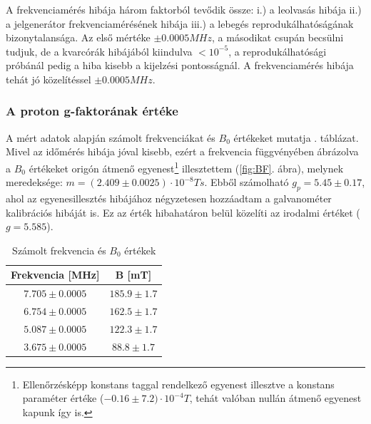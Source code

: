 \documentclass[a4paper,12pt]{article}
\begin{document}
A frekvenciamérés hibája három faktorból tevődik össze: i.) a leolvasás hibája ii.) a jelgenerátor frekvenciamérésének hibája iii.) a lebegés reprodukálhatóságának bizonytalansága. Az első mértéke $\pm0.0005MHz$, a másodikat csupán becsülni tudjuk, de a kvarcórák hibájából kiindulva $< 10^{-5}$, a reprodukálhatósági próbánál pedig a hiba kisebb a kijelzési pontosságnál. A frekvenciamérés hibája tehát jó közelítéssel $\pm0.0005MHz$.

\subsubsection{A proton g-faktorának értéke}

A mért adatok alapján számolt frekvenciákat és $B_0$ értékeket mutatja . táblázat. Mivel az időmérés hibája jóval kisebb, ezért a frekvencia függvényében ábrázolva a $B_0$ értékeket origón átmenő egyenest\footnote{Ellenőrzésképp konstans taggal rendelkező egyenest illesztve a konstans paraméter értéke ($-0.16\pm7.2)\cdot10^{-4}T$, tehát valóban nullán átmenő egyenest kapunk így is.} illesztettem (\ref{fig:BF}. ábra), melynek meredeksége: $m=(2.409\pm0.0025)\cdot10^{-8}Ts$. Ebből számolható $g_p = 5.45\pm0.17$, ahol az egyenesillesztés hibájához négyzetesen hozzáadtam a galvanométer kalibrációs hibáját is. Ez az érték hibahatáron belül közelíti az irodalmi értéket ($g= 5.585$).
\begin{table}[h]
	\begin{center}
	\begin{tabular}{|c|c|}
		\hline
		Frekvencia [MHz] & B [mT] \\ \hline \hline 

		$ 7.705\pm 0.0005 $&$185.9\pm 1.7 $  \\ \hline 

		$ 6.754\pm 0.0005 $&$162.5\pm 1.7 $  \\ \hline 

		$ 5.087\pm 0.0005 $&$122.3\pm 1.7 $  \\ \hline 

		$ 3.675\pm 0.0005 $&$88.8\pm 1.7 $  \\ \hline 

	\end{tabular}
	\end{center}
	\caption{Számolt frekvencia és $B_0$ értékek }
	\label{tab:szamolt}
\end{table}
\end{document}
